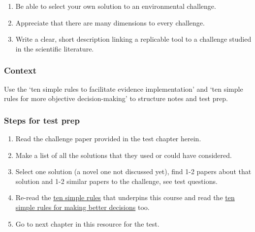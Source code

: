 \documentclass[
]{book}
\providecommand{\tightlist}{%
  \setlength{\itemsep}{0pt}\setlength{\parskip}{0pt}}
\begin{document}
\begin{enumerate}
\def\labelenumi{\arabic{enumi}.}
\tightlist
\item
  Be able to select your own solution to an environmental challenge.
\item
  Appreciate that there are many dimensions to every challenge.\\
\item
  Write a clear, short description linking a replicable tool to a challenge studied in the scientific literature.
\end{enumerate}

\hypertarget{context-4}{%
\subsubsection*{Context}\label{context-4}}

Use the `ten simple rules to facilitate evidence implementation' \citep{RN6861} and `ten simple rules for more objective decision-making' \citep{RN7223} to structure notes and test prep.

\hypertarget{steps-for-test-prep}{%
\subsubsection*{Steps for test prep}\label{steps-for-test-prep}}

\begin{enumerate}
\def\labelenumi{\arabic{enumi}.}
\tightlist
\item
  Read the challenge paper provided in the test chapter herein.\\
\item
  Make a list of all the solutions that they used or could have considered.
\item
  Select one solution (a novel one not discussed yet), find 1-2 papers about that solution and 1-2 similar papers to the challenge, see test questions.\\
\item
  Re-read the \href{https://www.facetsjournal.com/doi/10.1139/facets-2020-0021}{ten simple rules} that underpins this course and read the \href{https://journals.plos.org/ploscompbiol/article?id=10.1371/journal.pcbi.1007706}{ten simple rules for making better decisions} too.
\item
  Go to next chapter in this resource for the test.
\end{enumerate}
\end{document}
